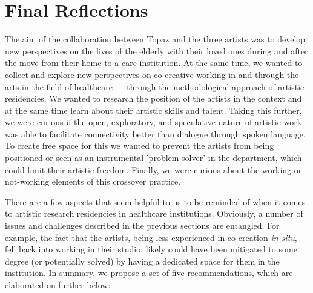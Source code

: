 \documentclass[authordate, empirical]{jote-new-article}
\begin{document}
	\section{Final Reflections}
	\begin{originalPurpose}
		The aim of the collaboration between Topaz and the three artists was to develop new perspectives on the lives of the elderly with their loved ones during and after the move from their home to a care institution. At the same time, we wanted to collect and explore new perspectives on co-creative working in and through the arts in the field of healthcare — through the methodological approach of artistic residencies. We wanted to research the position of the artists in the context and at the same time learn about their artistic skills and talent. Taking this further, we were curious if the open, exploratory, and speculative nature of artistic work was able to facilitate connectivity better than dialogue through spoken language. To create free space for this we wanted to prevent the artists from being positioned or seen as an instrumental 'problem solver' in the department, which could limit their artistic freedom. Finally, we were curious about the working or not-working elements of this crossover practice.
	\end{originalPurpose}


	There are a few aspects that seem helpful to us to be reminded of when it comes to artistic research residencies in healthcare institutions. Obviously, a number of issues and challenges described in the previous sections are entangled: For example, the fact that the artists, being less experienced in co-creation \emph{in situ}, fell back into working in their studio, likely could have been mitigated to some degree (or potentially solved) by having a dedicated space for them in the institution. In summary, we propose a set of five recommendations, which are elaborated on further below:
\end{document}
